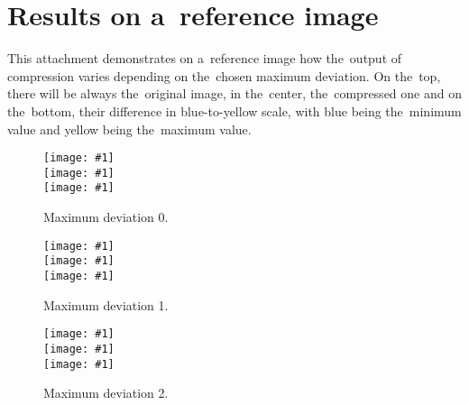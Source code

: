 \appendix

%
%
%
%
%

\openright

\chapter{Results on a~reference image}
\label{att:res_ref}

This attachment demonstrates on a~reference image how the~output of compression varies depending on the~chosen maximum deviation. On the~top, there will be always the~original image, in the~center, the~compressed one and on the~bottom, their difference in blue-to-yellow scale, with blue being the~minimum value and yellow being the~maximum value.

\newcommand{\incref}[1]{\texttt{[image: \#1]}}

\begin{figure}
	\begin{center}
		\incref{figures/out_0.png} \\ 
		\incref{figures/out_0.png} \\ 
		\incref{figures/out_diff_0.png} \\ 
	\end{center}
	\caption{Maximum deviation 0.}
\end{figure}

\begin{figure}
	\begin{center}
		\incref{figures/out_1.png} \\ 
		\incref{figures/out_1.png} \\ 
		\incref{figures/out_diff_1.png} \\ 
	\end{center}
	\caption{Maximum deviation 1.}
\end{figure}

\begin{figure}
	\begin{center}
		\incref{figures/out_2.png} \\ 
		\incref{figures/out_2.png} \\ 
		\incref{figures/out_diff_2.png} \\ 
	\end{center}
	\caption{Maximum deviation 2.}
\end{figure}

